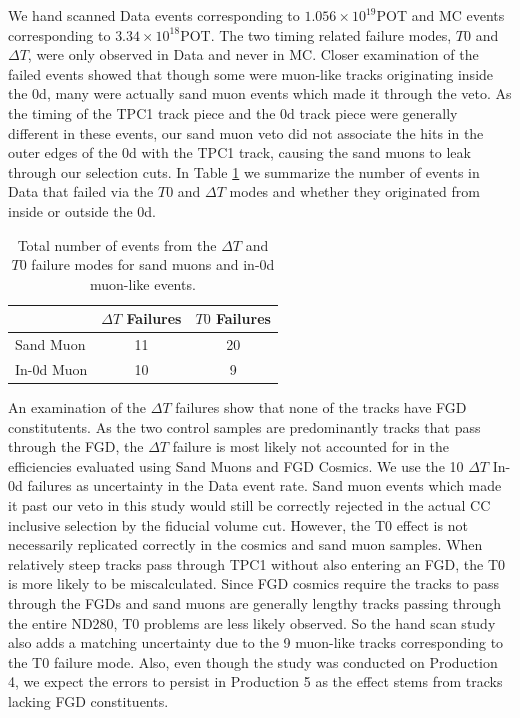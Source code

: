 We hand scanned Data events corresponding to $1.056\times 10^{19}$POT and MC events corresponding to $3.34\times 10^{18}$POT. The two timing related failure modes, $T0$ and $\Delta T$, were only observed in Data and never in MC. Closer examination of the failed events showed that though some were muon-like tracks originating inside the \p0d, many were actually sand muon events which made it through the veto. As the timing of the TPC1 track piece and the \p0d track piece were generally different in these events, our sand muon veto did not associate the hits in the outer edges of the \p0d with the TPC1 track, causing the sand muons to leak through our selection cuts. In Table \ref{tab:handscan} we summarize the number of events in Data that failed via the $T0$ and $\Delta T$ modes and whether they originated from inside or outside the \p0d.
\begin{table}[here]
\centering
\begin{tabular}{lcc}\toprule
& $\Delta T$ Failures & $T0$ Failures\\\midrule
Sand Muon & 11 & 20 \\
In-\p0d Muon & 10 & 9 \\\bottomrule
\end{tabular}
\caption{
Total number of events from the $\Delta T$ and $T0$ failure modes for sand muons and in-\p0d muon-like events.
}
\label{tab:handscan}
\end{table}

An examination of the $\Delta T$ failures show that none of the tracks have FGD constitutents. As the two control samples are predominantly tracks that pass through the FGD, the $\Delta T$ failure is most likely not accounted for in the efficiencies evaluated using Sand Muons and FGD Cosmics. We use the 10 $\Delta T$ In-\p0d failures as uncertainty in the Data event rate. 
Sand muon events which made it past our veto in this study would still be correctly rejected in the actual CC inclusive selection by the fiducial volume cut. However, the T0 effect is not necessarily replicated correctly in the cosmics and sand muon samples. When relatively steep tracks pass through TPC1 without also entering an FGD, the T0 is more likely to be miscalculated. Since FGD cosmics require the tracks to pass through the FGDs and sand muons are generally lengthy tracks passing through the entire ND280, T0 problems are less likely observed. So the hand scan study also adds a matching uncertainty due to the 9 muon-like tracks corresponding to the T0 failure mode. Also, even though the study was conducted on Production 4, we expect the errors to persist in Production 5 as the effect stems from tracks lacking FGD constituents.


